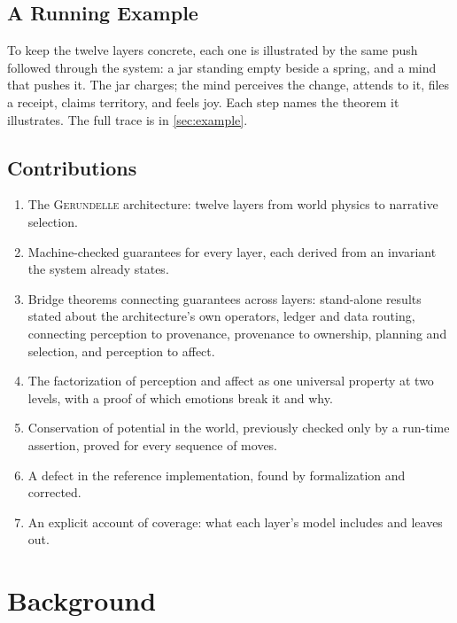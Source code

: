 \documentclass[11pt]{article}
\newcommand{\gerundelle}{\textsc{Gerundelle}}
\theoremstyle{remark}
\begin{document}
\subsection{A Running Example}

To keep the twelve layers concrete, each one is illustrated by the same push followed
through the system: a jar standing empty beside a spring, and a mind that pushes it. The
jar charges; the mind perceives the change, attends to it, files a receipt, claims
territory, and feels joy. Each step names the theorem it illustrates. The full trace is in
\cref{sec:example}.

\subsection{Contributions}

\begin{enumerate}[nosep]
    \item The \gerundelle{} architecture: twelve layers from world physics to narrative
    selection.
    \item Machine-checked guarantees for every layer, each derived from an invariant the
    system already states.
    \item Bridge theorems connecting guarantees across layers: stand-alone results stated
    about the architecture's own operators, ledger and data routing, connecting perception
    to provenance, provenance to ownership, planning and selection, and perception to affect.
    \item The factorization of perception and affect as one universal property at two
    levels, with a proof of which emotions break it and why.
    \item Conservation of potential in the world, previously checked only by a run-time
    assertion, proved for every sequence of moves.
    \item A defect in the reference implementation, found by formalization and corrected.
    \item An explicit account of coverage: what each layer's model includes and leaves out.
\end{enumerate}


\section{Background}
\label{sec:background}
\end{document}
